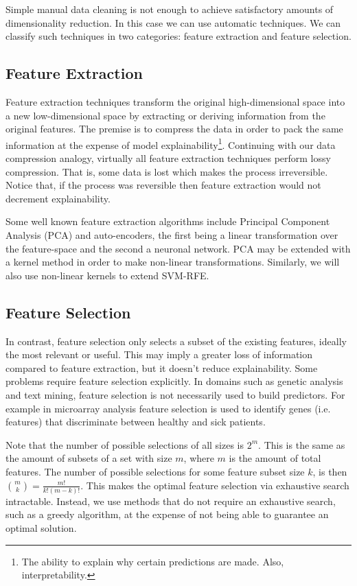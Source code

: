 Simple manual data cleaning is not enough to achieve satisfactory amounts of dimensionality reduction. In this case we can use automatic techniques. We can classify such techniques in two categories: feature extraction and feature selection.

\subsection{Feature Extraction}

Feature extraction techniques transform the original high-dimensional space into a new low-dimensional space by extracting or deriving information from the original features. The premise is to compress the data in order to pack the same information at the expense of model explainability\footnote{The ability to explain why certain predictions are made. Also, interpretability.}. Continuing with our data compression analogy, virtually all feature extraction techniques perform lossy com\-pres\-sion. That is, some data is lost which makes the process irreversible. Notice that, if the process was reversible then feature extraction would not decrement explainability.

Some well known feature extraction algorithms include Principal Component Analysis (PCA) and auto-encoders, the first being a linear transformation over the feature-space and the second a neuronal network. PCA may be extended with a kernel method in order to make non-linear transformations. Similarly, we will also use non-linear kernels to extend SVM-RFE.

\subsection{Feature Selection}
\label{sec:ch1.feature_selection}

In contrast, feature selection only selects a subset of the existing features, ideally the most relevant or useful. This may imply a greater loss of information compared to feature extraction, but it doesn't reduce explainability. Some problems require feature selection explicitly. In domains such as genetic analysis and text mining, feature selection is not necessarily used to build predictors. For example in micro\-array analysis feature selection is used to identify genes (i.e. features) that dis\-criminate between healthy and sick patients. 

Note that the number of possible selections of all sizes is $2^m$. This is the same as the amount of subsets of a set with size $m$, where $m$ is the amount of total features. The number of possible selections for some feature subset size $k$, is then ${m \choose k} = \frac{m!}{k!(m - k)!}$. This makes the optimal feature selection via exhaustive search intractable. Instead, we use methods that do not require an exhaustive search, such as a greedy algorithm, at the expense of not being able to guarantee an optimal solution.

